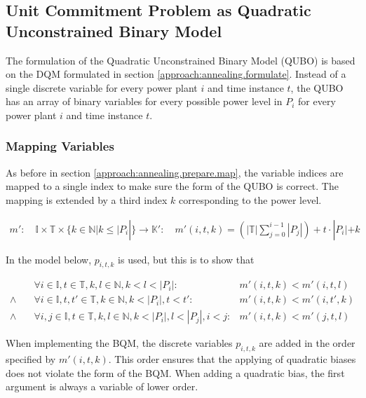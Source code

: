 \subsection{Unit Commitment Problem as Quadratic Unconstrained Binary Model}

The formulation of the Quadratic Unconstrained Binary Model (QUBO) is based on the DQM formulated in section \ref{approach:annealing.formulate}.
Instead of a single discrete variable for every power plant $i$ and time instance $t$, the QUBO has an array of binary variables for every possible power level in $P_i$ for every power plant $i$ and time instance $t$.

\subsubsection{Mapping Variables}

As before in section \ref{approach:annealing.prepare.map}, the variable indices are mapped to a single index to make sure the form of the QUBO is correct.
The mapping is extended by a third index $k$ corresponding to the power level.

\begin{align}
  m':
  \quad
  \mathbb{I}
  \times \mathbb{T}
  \times \{k \in \mathbb{N} | k \leq |P_i|\} \to \mathbb{K}':
  \quad
  m'(i, t, k) = \left( |\mathbb{T}| \sum_{j=0}^{i-1} |P_j| \right)
  + t \cdot |P_i|
  + k
  \label{formula:qubo.mapping}
\end{align}

In the model below, $p_{i,t,k}$ is used, but this is to show that

\begin{subequations}
\begin{align}
  &
  \forall i \in \mathbb{I}, t \in \mathbb{T}, k, l \in \mathbb{N}, k < l < |P_i|:
  &
  m'(i, t, k) < m'(i, t, l)
  \\
  \land \quad
  &
  \forall i \in \mathbb{I}, t, t' \in \mathbb{T}, k \in \mathbb{N}, k < |P_i|, t < t':
  &
  m'(i, t, k) < m'(i, t', k)
  \\
  \land \quad
  &
  \forall i, j \in \mathbb{I}, t  \in \mathbb{T}, k, l \in \mathbb{N}, k < |P_i|, l < |P_j|, i < j:
  &
  m'(i, t, k) < m'(j, t, l)
\end{align}
\end{subequations}

When implementing the BQM, the discrete variables $p_{i, t, k}$ are added in the order specified by $m'(i, t, k)$.
This order ensures that the applying of quadratic biases does not violate the form of the BQM.
When adding a quadratic bias, the first argument is always a variable of lower order.

